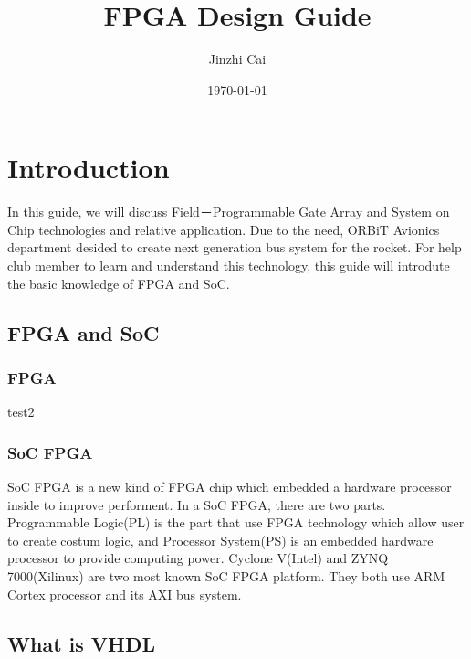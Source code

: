 \documentclass[12pt,article]{memoir}
\title{FPGA Design Guide}
\author{Jinzhi Cai}
\date{\today}
\begin{document}
	


\tableofcontents*
\clearpage


\chapter{Introduction}
In this guide, we will discuss Field－Programmable Gate Array and System on Chip technologies and relative application. Due to the need, ORBiT Avionics department desided to create next generation bus system for the rocket. For help club member to learn and understand this technology, this guide will introdute the basic knowledge of FPGA and SoC.
\section{FPGA and SoC}
\subsection{FPGA}
test2
\subsection{SoC FPGA}
SoC FPGA is a new kind of FPGA chip which embedded a hardware processor inside to improve performent. In a SoC FPGA, there are two parts. Programmable Logic(PL) is the part that use FPGA technology which allow user to create costum logic, and Processor System(PS) is an embedded hardware processor to provide computing power. Cyclone V(Intel) and ZYNQ 7000(Xilinux) are two most known SoC FPGA platform. They both use ARM Cortex processor and its AXI bus system.
\section{What is VHDL}
\end{document}
